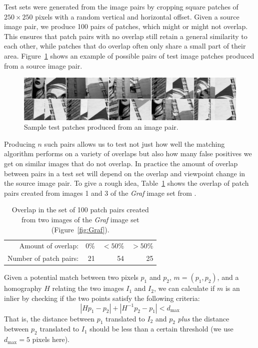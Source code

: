 \documentclass[conference]{IEEEtran}
\begin{document}
Test sets were generated from the image pairs by cropping square patches 
of $250\!\times\!250$ pixels with a random vertical and horizontal 
offset.  Given a source image pair, we produce 100 pairs of patches, 
which might or might not overlap.  This ensures that patch pairs with no 
overlap still retain a general similarity to each other, while patches 
that do overlap often only share a small part of their area.  
Figure~\ref{fig:fairey} shows an example of possible pairs of test image 
patches produced from a source image pair.  

\begin{figure}[htb]
    \centering
    \includegraphics[width=\columnwidth]{images/crop_examples}
    \caption{Sample test patches produced from an image pair.}
	\label{fig:fairey}
\end{figure}


Producing $n$ such pairs allows us to test not just how well the 
matching algorithm performs on a variety of overlaps but also how many 
false positives we get on similar images that do not 
overlap.
In practice the amount of overlap between pairs in a test set will 
depend on the overlap and viewpoint change in the source image pair.  To 
give a rough idea, Table~\ref{table:overlap} shows the overlap of patch 
pairs created from images 1 and 3 of the \emph{Graf} image set from 
\cite{mikolajczyk2005performance}.

\begin{table}[htb]
\caption{Overlap in the set of 100 patch pairs created from two images of the \emph{Graf} image set (Figure~\ref{fig:Graf}).}
\label{table:overlap}
	\centering
\begin{tabular}{r*{3}{r}}
\hline
	Amount of overlap: & 0\% & $< 50$\% & $> 50$\%  \\
	\noalign{\smallskip}
	Number of patch pairs: & 21 & 54 & 25 \\
	\hline
\end{tabular}
\end{table}


Given a potential match between two pixels $p_1$ and 
$p_2$, $m = \left(p_1, p_2\right)$, and a homography $H$ relating the two images $I_1$ and $I_2$, we 
can calculate if $m$ is an inlier by checking if the two points satisfy the following criteria:
\begin{equation*}
\left\vert H p_1 - p_2 \right\vert + \left\vert H^{-1}p_2 - p_1 \right\vert < d_{\max}
\end{equation*}
That is, the distance between $p_1$ translated to $I_2$ and $p_2$ 
\emph{plus} the distance between $p_2$ translated to $I_1$ should be 
less than a certain threshold (we use $d_{\max}=5$ pixels here).
\end{document}
